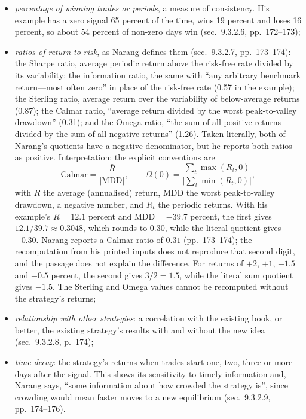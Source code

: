 \begin{qfmethod}
\begin{itemize}
\item \emph{percentage of winning trades or periods}, a measure of consistency. His example has a zero signal 65 percent of the time, wins 19 percent and loses 16 percent, so about 54 percent of non-zero days win (sec.~9.3.2.6, pp.~172--173);
\item \emph{ratios of return to risk}, as Narang defines them (sec.~9.3.2.7, pp.~173--174): the Sharpe ratio, average periodic return above the risk-free rate divided by its variability; the information ratio, the same with ``any arbitrary benchmark return---most often zero'' in place of the risk-free rate (0.57 in the example); the Sterling ratio, average return over the variability of below-average returns (0.87); the Calmar ratio, ``average return divided by the worst peak-to-valley drawdown'' (0.31); and the Omega ratio, ``the sum of all positive returns divided by the sum of all negative returns'' (1.26). Taken literally, both of Narang's quotients have a negative denominator, but he reports both ratios as positive. Interpretation: the explicit conventions are
\[ \text{Calmar}=\frac{\bar R}{\lvert \mathrm{MDD}\rvert},\qquad \Omega(0)=\frac{\sum_t \max(R_t,0)}{\bigl\lvert\sum_t \min(R_t,0)\bigr\rvert}, \]
with $\bar R$ the average (annualised) return, $\mathrm{MDD}$ the worst peak-to-valley drawdown, a negative number, and $R_t$ the periodic returns. With his example's $\bar R=12.1$ percent and $\mathrm{MDD}=-39.7$ percent, the first gives $12.1/39.7\approx0.3048$, which rounds to $0.30$, while the literal quotient gives $-0.30$. Narang reports a Calmar ratio of $0.31$ (pp.~173--174); the recomputation from his printed inputs does not reproduce that second digit, and the passage does not explain the difference. For returns of $+2$, $+1$, $-1.5$ and $-0.5$ percent, the second gives $3/2=1.5$, while the literal sum quotient gives $-1.5$. The Sterling and Omega values cannot be recomputed without the strategy's returns;
\item \emph{relationship with other strategies}: a correlation with the existing book, or better, the existing strategy's results with and without the new idea (sec.~9.3.2.8, p.~174);
\item \emph{time decay}: the strategy's returns when trades start one, two, three or more days after the signal. This shows its sensitivity to timely information and, Narang says, ``some information about how crowded the strategy is'', since crowding would mean faster moves to a new equilibrium (sec.~9.3.2.9, pp.~174--176).
\end{itemize}


\end{qfmethod}
